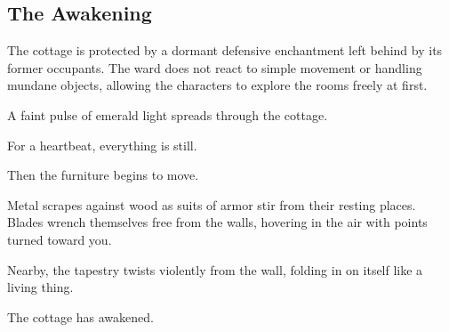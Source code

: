 \subsection*{The Awakening}
{\entryfont The cottage is protected by a dormant defensive enchantment left behind by its former occupants. The ward does not react to simple movement or handling mundane objects, allowing the characters to explore the rooms freely at first.}
\begin{DndReadAloud}
	A faint pulse of emerald light spreads through the cottage.

	For a heartbeat, everything is still.

	Then the furniture begins to move.

	Metal scrapes against wood as suits of armor stir from their resting places. Blades wrench themselves free from the walls, hovering in the air with points turned toward you.

	Nearby, the tapestry twists violently from the wall, folding in on itself like a living thing.

	The cottage has awakened.
\end{DndReadAloud}
\vspace*{0.5cm}
